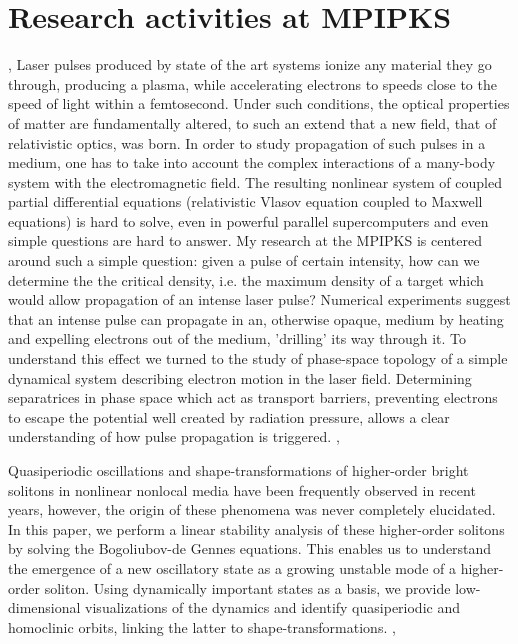 \documentclass[11pt,a4paper,final]{moderncv}
\begin{document}
\section{Research activities at MPIPKS}
\sep
{}
Laser pulses produced by state of the art systems ionize any material they go through, 
producing a plasma, while accelerating electrons to speeds close to the speed of light within a femtosecond. 
Under such conditions, the optical properties of matter are fundamentally altered, to such an extend that a new field, that of relativistic optics, was born. 
In order to study propagation of such pulses in a medium, one has to take into account the complex interactions of a many-body system with the electromagnetic field.
The resulting nonlinear system of coupled partial differential equations (relativistic Vlasov equation coupled to Maxwell equations) is hard to solve, 
even in powerful parallel supercomputers and even simple questions are hard to answer. 
My research at the MPIPKS is centered around such a simple question: given a pulse of certain intensity, how can we determine the the critical density, 
i.e. the maximum density of a target which would allow propagation of an intense laser pulse? Numerical experiments suggest that 
an intense pulse can propagate in an, otherwise opaque, medium by heating and expelling electrons out of the medium, 'drilling' its way through it. 
To understand this effect we turned to the study of phase-space topology of a simple dynamical system describing electron motion in the laser field. 
Determining separatrices in phase space which act as transport barriers, preventing electrons to escape the potential well created by radiation pressure, 
allows a clear understanding of how pulse propagation is triggered.
\sep 

Quasiperiodic oscillations and shape-transformations of higher-order bright solitons in nonlinear nonlocal media have been frequently observed in recent years, 
however, the origin of these phenomena was never completely elucidated. In this paper, we perform a linear stability analysis of these higher-order solitons 
by solving the Bogoliubov-de Gennes equations. This enables us to understand the emergence of a new oscillatory state 
as a growing unstable mode of a higher-order soliton. Using dynamically important states as a basis, we provide low-dimensional 
visualizations of the dynamics and identify quasiperiodic and homoclinic orbits, linking the latter to shape-transformations. 
\sep
\end{document}
